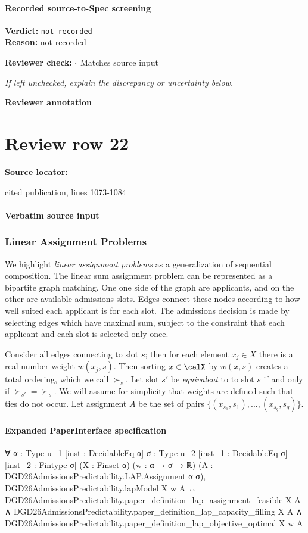 \documentclass[10pt]{article}
\newcommand{\reviewerbox}{%
  \par\noindent\fbox{\parbox{0.96\linewidth}{\rule{0pt}{0.38in}}}\par
}
\newcommand{\reviewmatch}[1]{%
  \par\noindent\textbf{Reviewer check:} $\square$\; #1\par
  \noindent\emph{If left unchecked, explain the discrepancy or uncertainty below.}\par
}
\begin{document}
\paragraph{Recorded source-to-Spec screening}
\textbf{Verdict:} \texttt{not recorded}
\\
\textbf{Reason:} not recorded
\reviewmatch{Matches source input}
\noindent\textbf{Reviewer annotation}\par
\reviewerbox
\clearpage
\hypertarget{source-claim-a009d7013e95842d}{}
\section*{Review row 22}
\textbf{Source locator:} {\footnotesize\raggedright cited publication, lines 1073-\allowbreak{}1084\par}
\paragraph{Verbatim source input}
\begin{ReviewVerbatim}
\subsubsection{Linear Assignment Problems} \label{sec:lap-proofs}

We highlight \textit{linear assignment problems} as a generalization of sequential composition.
The linear sum assignment problem can be represented as a bipartite graph matching.
One one side of the graph are applicants, and on the other are available admissions slots.
Edges connect these nodes according to how well suited each applicant is for each slot.
The admissions decision is made by selecting edges which have maximal sum, subject to the constraint that each applicant and each slot is selected only once.

Consider all edges connecting to slot $s$; then for each element  $x_j \in X$ there is a real number weight $w(x_j, s)$. Then sorting $x \in \calX$ by $w(x,s)$ creates a total ordering, which we call $\succ_s$. Let slot $s'$ be \textit{equivalent} to
to slot $s$ if and only if $\succ_{s'} = \succ_{s}$.
We will assume for simplicity that weights are defined such that ties do not occur.
Let assignment $A$ be the set of pairs $\{(x_{s_1}, s_1), ..., (x_{s_q}, s_q)\}$.
\end{ReviewVerbatim}


\paragraph{Expanded PaperInterface specification}
\begin{ReviewVerbatim}
∀ {α : Type u_1} [inst : DecidableEq α] {σ : Type u_2} [inst_1 : DecidableEq σ] [inst_2 : Fintype σ] (X : Finset α)
  (w : α → σ → ℝ) (A : DGD26AdmissionsPredictability.LAP.Assignment α σ),
  DGD26AdmissionsPredictability.lapModel X w A ↔
    DGD26AdmissionsPredictability.paper_definition_lap_assignment_feasible X A ∧
      DGD26AdmissionsPredictability.paper_definition_lap_capacity_filling X A ∧
        DGD26AdmissionsPredictability.paper_definition_lap_objective_optimal X w A
\end{ReviewVerbatim}
\end{document}
